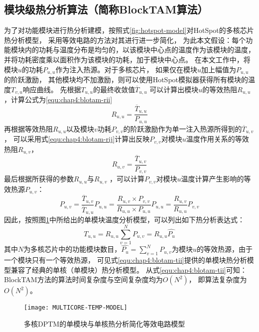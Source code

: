\subsection{模块级热分析算法（简称BlockTAM算法）}
为了对功能模块进行热分析建模，按照式\ref{fig:hotspot-model}对HotSpot的多核芯片热分析模型， 采用等效电路的方法对其进行进一步简化， 为此本文假设：每个功能模块内的功耗与温度分布是均匀的，以该模块中心点的温度作为该模块的温度， 并将功耗密度乘以面积作为该模块的功耗，加于模块中心点。
在本文工作中，将模块$u$的功耗$P_{u,u}$作为注入热源。对于多核芯片， 如果仅在模块$u$加上幅值为$P_{u,u}$的阶跃激励， 其他模块均不加激励，则可以使用HotSpot模拟器获得所有模块的温度$T_{v,u}$响应曲线。 先根据$T_{u,u}$的最终收敛值$\overline{T}_{u,u}$ 可以计算出模块$u$的等效热阻$R_{u,u}$，计算公式为\ref{equ:chap4:blotam-rii}
\begin{equation}
\label{equ:chap4:blotam-rii}
R_{u,u} = \frac{\overline{T}_{u,u}}{P_{u,u}}
\end{equation}
再根据等效热阻$R_{u,u}$以及模块$v$功耗$P_{v,v}$的阶跃激励作为单一注入热源所得到的$\overline{T}_{u,v}$， 可以采用式\ref{equ:chap4:blotam-rij}计算出反映$P_{v,v}$对模块$u$温度作用关系的等效热阻$R_{u,v}$，
\begin{equation}
\label{equ:chap4:blotam-rij}
R_{u,v} = \frac{\overline{T}_{u,v}}{P_{v,v}}
\end{equation}
最后根据所获得的参数$R_{u,u}$与$R_{u,v}$ ，可以计算$P_{v,v}$对模块$u$温度计算产生影响的等效热源$P_{u,v}$：
\begin{equation}
\label{equ:chap4:blotam-pij}
P_{u,v} = \frac{\overline{T}_{u,v}}{\overline{T}_{u,u}}P_{u,u} = \frac{R_{u,v}\times P_{v,v}}{R_{u,u}\times P_{u,u}}P_{u,u}=\frac{R_{u,v}}{R_{u,u}}P_{v,v}
\end{equation}
因此，按照图\ref{fig:multicore-temp-model}中所给出的单模块温度分析模型，可以列出如下热分析表达式：
\begin{equation}
\label{equ:chap4:blotam-tii}
T_{u,u} = R_{u,u}\sum\limits_{v=1}^N P_{u,v} = R_{u,u}\widehat{P_{u}}
\end{equation}
其中$N$为多核芯片中的功能模块数目，$\widehat{P_{u}} = \sum\limits_{v=1}^N P_{u,v}$为模块$u$的等效热源，由于一个模块只有一个等效热源， 可见式\ref{equ:chap4:blotam-tii}提供的单模块热分析模型兼容了经典的单核（单模块）热分析模型。 从式\ref{equ:chap4:blotam-tii}可知：BlockTAM方法的算法时间复杂度与空间复杂度均为$O(N^2)$， 即算法复杂度为$O(N^2)$。
\begin{figure}[H]
  \centering
  \texttt{[image: MULTICORE-TEMP-MODEL]}
  \caption{多核DPTM的单模块与单核热分析简化等效电路模型}
  \label{fig:multicore-temp-model}
\end{figure}

